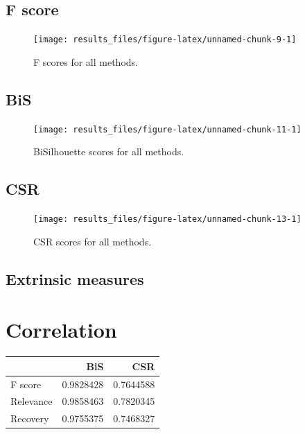 \documentclass[
]{article}
\begin{document}
\hypertarget{f-score}{%
\subsection{F score}\label{f-score}}

\begin{figure}[H]

{\centering \texttt{[image: results\_files/figure-latex/unnamed-chunk-9-1]} 

}

\caption{F scores for all methods.}\label{fig:unnamed-chunk-9}
\end{figure}

\hypertarget{bis}{%
\subsection{BiS}\label{bis}}

\begin{figure}[H]

{\centering \texttt{[image: results\_files/figure-latex/unnamed-chunk-11-1]} 

}

\caption{BiSilhouette scores for all methods.}\label{fig:unnamed-chunk-11}
\end{figure}

\hypertarget{csr}{%
\subsection{CSR}\label{csr}}

\begin{figure}[H]

{\centering \texttt{[image: results\_files/figure-latex/unnamed-chunk-13-1]} 

}

\caption{CSR scores for all methods.}\label{fig:unnamed-chunk-13}
\end{figure}

\hypertarget{extrinsic-measures}{%
\subsection{Extrinsic measures}\label{extrinsic-measures}}

\hypertarget{correlation}{%
\section{Correlation}\label{correlation}}

\begin{tabular}[t]{lrr}
\toprule
  & BiS & CSR\\
\midrule
F score & 0.9828428 & 0.7644588\\
Relevance & 0.9858463 & 0.7820345\\
Recovery & 0.9755375 & 0.7468327\\
\bottomrule
\end{tabular}
\end{document}
